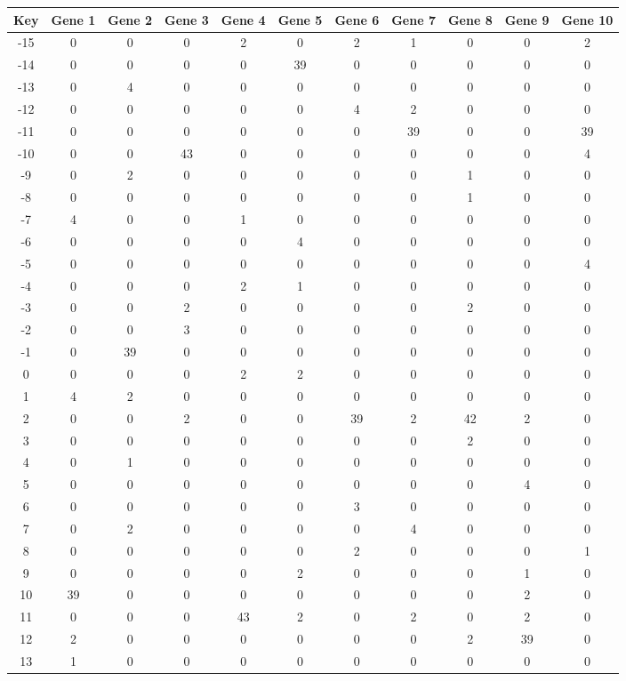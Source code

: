 \begin{tabular}{|c|c|c|c|c|c|c|c|c|c|c|}
\hline
Key & Gene 1 & Gene 2 & Gene 3 & Gene 4 & Gene 5 & Gene 6 & Gene 7 & Gene 8 & Gene 9 & Gene 10 \\
\hline
-15 & 0 & 0 & 0 & 2 & 0 & 2 & 1 & 0 & 0 & 2 \\
-14 & 0 & 0 & 0 & 0 & 39 & 0 & 0 & 0 & 0 & 0 \\
-13 & 0 & 4 & 0 & 0 & 0 & 0 & 0 & 0 & 0 & 0 \\
-12 & 0 & 0 & 0 & 0 & 0 & 4 & 2 & 0 & 0 & 0 \\
-11 & 0 & 0 & 0 & 0 & 0 & 0 & 39 & 0 & 0 & 39 \\
-10 & 0 & 0 & 43 & 0 & 0 & 0 & 0 & 0 & 0 & 4 \\
-9 & 0 & 2 & 0 & 0 & 0 & 0 & 0 & 1 & 0 & 0 \\
-8 & 0 & 0 & 0 & 0 & 0 & 0 & 0 & 1 & 0 & 0 \\
-7 & 4 & 0 & 0 & 1 & 0 & 0 & 0 & 0 & 0 & 0 \\
-6 & 0 & 0 & 0 & 0 & 4 & 0 & 0 & 0 & 0 & 0 \\
-5 & 0 & 0 & 0 & 0 & 0 & 0 & 0 & 0 & 0 & 4 \\
-4 & 0 & 0 & 0 & 2 & 1 & 0 & 0 & 0 & 0 & 0 \\
-3 & 0 & 0 & 2 & 0 & 0 & 0 & 0 & 2 & 0 & 0 \\
-2 & 0 & 0 & 3 & 0 & 0 & 0 & 0 & 0 & 0 & 0 \\
-1 & 0 & 39 & 0 & 0 & 0 & 0 & 0 & 0 & 0 & 0 \\
0 & 0 & 0 & 0 & 2 & 2 & 0 & 0 & 0 & 0 & 0 \\
1 & 4 & 2 & 0 & 0 & 0 & 0 & 0 & 0 & 0 & 0 \\
2 & 0 & 0 & 2 & 0 & 0 & 39 & 2 & 42 & 2 & 0 \\
3 & 0 & 0 & 0 & 0 & 0 & 0 & 0 & 2 & 0 & 0 \\
4 & 0 & 1 & 0 & 0 & 0 & 0 & 0 & 0 & 0 & 0 \\
5 & 0 & 0 & 0 & 0 & 0 & 0 & 0 & 0 & 4 & 0 \\
6 & 0 & 0 & 0 & 0 & 0 & 3 & 0 & 0 & 0 & 0 \\
7 & 0 & 2 & 0 & 0 & 0 & 0 & 4 & 0 & 0 & 0 \\
8 & 0 & 0 & 0 & 0 & 0 & 2 & 0 & 0 & 0 & 1 \\
9 & 0 & 0 & 0 & 0 & 2 & 0 & 0 & 0 & 1 & 0 \\
10 & 39 & 0 & 0 & 0 & 0 & 0 & 0 & 0 & 2 & 0 \\
11 & 0 & 0 & 0 & 43 & 2 & 0 & 2 & 0 & 2 & 0 \\
12 & 2 & 0 & 0 & 0 & 0 & 0 & 0 & 2 & 39 & 0 \\
13 & 1 & 0 & 0 & 0 & 0 & 0 & 0 & 0 & 0 & 0 \\
\hline
\end{tabular}